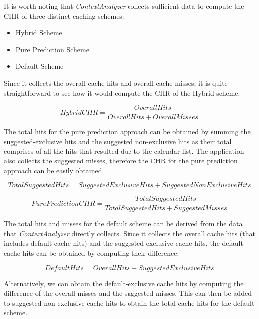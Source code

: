 \documentclass[12pt]{uthesis-v12}  %
\begin{document}
		It is worth noting that {\em ContextAnalyzer} collects sufficient data to compute the CHR of three distinct caching schemes:
		
		\begin{itemize}			
			\item Hybrid Scheme
			\item Pure Prediction Scheme
			\item Default Scheme
		\end{itemize}
		
		Since it collects the overall cache hits and overall cache misses, it is quite straightforward to see how it would compute the CHR of the Hybrid scheme.
		
		\begin{equation}
			Hybrid CHR = \frac{Overall Hits}{Overall Hits + Overall Misses}
		\end{equation}
		
		The total hits for the pure prediction approach can be obtained by summing the suggested-exclusive hits and the suggested non-exclusive hits as their total comprises of all the hits that resulted due to the calendar list. The application also collects the suggested misses, therefore the CHR for the pure prediction approach can be easily obtained.
		
		\begin{equation}
			Total Suggested Hits = SuggestedExclusive  Hits + Suggested NonExclusive  Hits			
		\end{equation}
		
		\begin{equation}			
			Pure Prediction CHR = \frac{Total Suggested Hits}{Total Suggested Hits + Suggested Misses}
		\end{equation}
		
		The total hits and misses for the default scheme can be derived from the data that {\em ContextAnalyzer} directly collects. Since it collects the overall cache hits (that includes default cache hits) and the suggested-exclusive cache hits, the default cache hits can be obtained by computing their difference:
		
		\begin{equation}
			Default Hits = Overall Hits - Suggested Exclusive Hits
		\end{equation}
		
		Alternatively, we can obtain the default-exclusive cache hits by computing the difference of the overall misses and the suggested misses. This can then be added to suggested non-exclusive cache hits to obtain the total cache hits for the default scheme.
		
\end{document}
